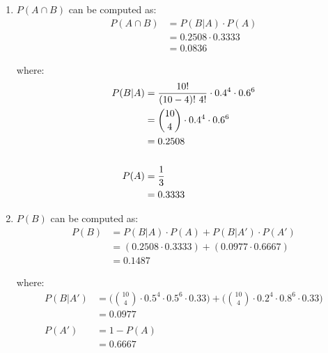 \documentclass{article}
\begin{document}
\begin{enumerate}
    \begin{enumerate}
        \item $P(A \cap B)$ can be computed as:
            \begin{equation}
            \begin{split}
                P(A \cap B) &= P(B|A) \cdot P(A)\\
                &= 0.2508 \cdot 0.3333\\
                &= 0.0836
            \end{split}
            \end{equation}

            where:
            \begin{equation}
            \begin{split}
                P(B|A) &= \frac{10!}{(10-4)! \text{\space} 4!} \cdot 0.4^{4} \cdot 0.6^{6}\\
                &= {10\choose 4}\cdot 0.4^{4} \cdot 0.6^{6}\\
                &= 0.2508\\~\\
                P(A) &= \frac{1}{3}\\
                &= 0.3333
            \end{split}
            \end{equation}
            
        \item $P(B)$ can be computed as:
            \begin{equation}
            \begin{split}
                P(B) &= P(B|A) \cdot P(A) + P(B|A') \cdot P(A')\\
                &= (0.2508 \cdot 0.3333) + (0.0977 \cdot 0.6667)\\
                &= 0.1487
            \end{split}
            \end{equation}

            where:
            \begin{equation}
            \begin{split}
                P(B|A') &= \biggl({10\choose 4} \cdot 0.5^{4} \cdot 0.5^{6} \cdot 0.33 \biggl) + \biggl({10\choose 4} \cdot 0.2^{4} \cdot 0.8^{6} \cdot 0.33\biggl)\\
                &= 0.0977\\~\\
                P(A') &= 1 - P(A)\\
                &= 0.6667
            \end{split}
            \end{equation}


\end{enumerate}
\end{enumerate}
\end{document}
